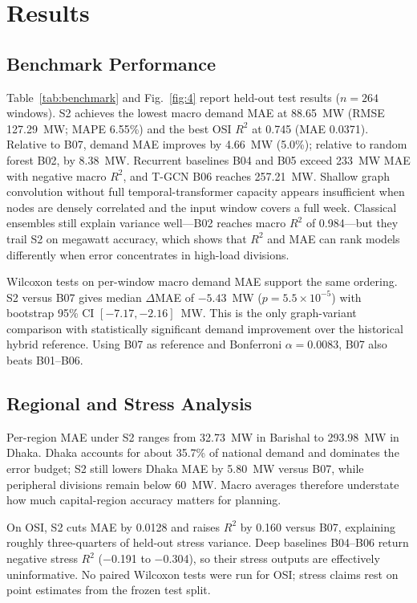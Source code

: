 \section{Results}\label{sec:results}

\subsection{Benchmark Performance}

Table~\ref{tab:benchmark} and Fig.~\ref{fig:4} report held-out test results ($n{=}264$ windows). S2 achieves the lowest macro demand MAE at 88.65~MW (RMSE 127.29~MW; MAPE 6.55\%) and the best OSI $R^2$ at 0.745 (MAE 0.0371). Relative to B07, demand MAE improves by 4.66~MW (5.0\%); relative to random forest B02, by 8.38~MW. Recurrent baselines B04 and B05 exceed 233~MW MAE with negative macro $R^2$, and T-GCN B06 reaches 257.21~MW. Shallow graph convolution without full temporal-transformer capacity appears insufficient when nodes are densely correlated and the input window covers a full week. Classical ensembles still explain variance well---B02 reaches macro $R^2$ of 0.984---but they trail S2 on megawatt accuracy, which shows that $R^2$ and MAE can rank models differently when error concentrates in high-load divisions.




Wilcoxon tests on per-window macro demand MAE support the same ordering. S2 versus B07 gives median $\Delta$MAE of $-5.43$~MW ($p{=}5.5{\times}10^{-5}$) with bootstrap 95\% CI $[-7.17, -2.16]$~MW. This is the only graph-variant comparison with statistically significant demand improvement over the historical hybrid reference. Using B07 as reference and Bonferroni $\alpha{=}0.0083$, B07 also beats B01--B06.

\subsection{Regional and Stress Analysis}

Per-region MAE under S2 ranges from 32.73~MW in Barishal to 293.98~MW in Dhaka. Dhaka accounts for about 35.7\% of national demand and dominates the error budget; S2 still lowers Dhaka MAE by 5.80~MW versus B07, while peripheral divisions remain below 60~MW. Macro averages therefore understate how much capital-region accuracy matters for planning.

On OSI, S2 cuts MAE by 0.0128 and raises $R^2$ by 0.160 versus B07, explaining roughly three-quarters of held-out stress variance. Deep baselines B04--B06 return negative stress $R^2$ ($-$0.191 to $-$0.304), so their stress outputs are effectively uninformative. No paired Wilcoxon tests were run for OSI; stress claims rest on point estimates from the frozen test split.

